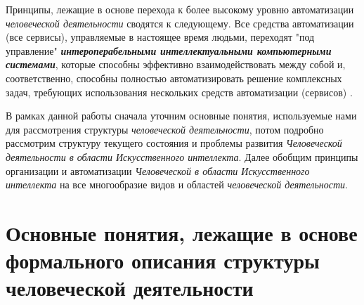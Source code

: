 Принципы, лежащие в основе перехода к более высокому уровню автоматизации \textit{человеческой деятельности} сводятся к следующему. Все средства автоматизации (все сервисы), управляемые в настоящее время людьми, переходят "под управление"{} \textbf{\textit{интероперабельными интеллектуальными компьютерными системами}}, которые способны эффективно взаимодействовать между собой и, соответственно, способны полностью автоматизировать решение комплексных задач, требующих использования нескольких средств автоматизации (сервисов) .

В рамках данной работы сначала уточним основные понятия, используемые нами для рассмотрения структуры \textit{человеческой деятельности}, потом подробно рассмотрим структуру текущего состояния и проблемы развития \textit{Человеческой деятельности в области Искусственного интеллекта}. Далее обобщим принципы организации и автоматизации \textit{Человеческой в области Искусственного интеллекта} на все многообразие видов и областей \textit{человеческой деятельности}.

\section{Основные понятия, лежащие в основе формального описания структуры человеческой деятельности}
\label{sec_activity_concepts}

